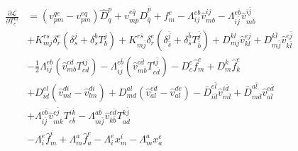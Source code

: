 \documentclass[a4paper,12pt,oneside]{book}
\newcommand{\half}{\frac{1}{2}}
\newcommand{\spa}[1]{{#1}}
\newcommand{\spb}[1]{\bar{#1}}
\begin{document}
\begin{equation}
\begin{aligned}
\frac{\partial\mathcal{L}}{\partial T^{\spa{m}}_{\spa{e}}}&=
\left(v_{\spa{p}\spa{m}}^{\spa{q}\spa{e}} - v_{\spa{p}\spa{m}}^{\spa{e}\spa{q}}\right) \hat D^{\spa{p}}_{\spa{q}}
+ v_{\spa{m}\spb{p}}^{\spa{e}\spb{q}} \hat D^{\spb{p}}_{\spb{q}}
+ f_{\spa{m}}^{\spa{e}}
- Λ_{\spa{i}\spa{j}}^{\spa{e}\spa{b}} \hat v_{\spa{m}\spa{b}}^{\spa{i}\spa{j}}
- Λ_{\spa{i}\spb{j}}^{\spa{e}\spb{b}} \hat v_{\spa{m}\spb{b}}^{\spa{i}\spb{j}}\\
&+ K_{\spa{m}\spa{j}}^{\spa{r}\spa{s}} \delta_{\spa{r}}^{\spa{e}} \left(\delta_{\spa{s}}^{\spa{j}} + \delta_{\spa{s}}^{\spa{b}} T^{\spa{j}}_{\spa{b}} \right) 
+ K_{\spa{m}\spb{j}}^{\spa{r}\spb{s}} \delta_{\spa{r}}^{\spa{e}} \left(\delta_{\spb{s}}^{\spb{j}} + \delta_{\spb{s}}^{\spb{b}} T^{\spb{j}}_{\spb{b}} \right) 
+ D_{\spa{m}\spa{j}}^{\spa{k}\spa{l}} \hat v_{\spa{k}\spa{l}}^{\spa{e}\spa{j}}
+ D_{\spa{m}\spb{j}}^{\spa{k}\spb{l}} \hat v_{\spa{k}\spb{l}}^{\spa{e}\spb{j}}\\
&- \half Λ_{\spa{i}\spa{j}}^{\spa{e}\spa{b}} \left(\hat v_{\spa{m}\spa{b}}^{\spa{c}\spa{d}} T^{\spa{i}\spa{j}}_{\spa{c}\spa{d}}\right)
- Λ_{\spa{i}\spb{j}}^{\spa{e}\spb{b}} \left(\hat v_{\spa{m}\spb{b}}^{\spa{c}\spb{d}} T^{\spa{i}\spb{j}}_{\spa{c}\spb{d}}\right)
- D_{\spa{c}}^{\spa{e}} \hat f_{\spa{m}}^{\spa{c}}
+ D_{\spa{m}}^{\spa{k}} \hat f_{\spa{k}}^{\spa{e}}\\
&+ D_{\spa{i}\spa{d}}^{\spa{e}\spa{l}} 
 \left(\hat v_{\spa{m}\spa{l}}^{\spa{d}\spa{i}}-\hat v_{\spa{l}\spa{m}}^{\spa{d}\spa{i}}\right)
+ D_{\spa{m}\spa{d}}^{\spa{a}\spa{l}} 
 \left(\hat v_{\spa{a}\spa{l}}^{\spa{e}\spa{d}}-\hat v_{\spa{a}\spa{l}}^{\spa{d}\spa{e}}\right) 
- \bar D_{\spa{i}\spb{d}}^{\spa{e}\spb{l}} \hat v_{\spa{m}\spb{l}}^{\spa{i}\spb{d}}  
+ \bar D_{\spa{m}\spb{d}}^{\spa{a}\spb{l}} \hat v_{\spa{a}\spb{l}}^{\spa{e}\spb{d}} \\
&+ Λ_{\spa{i}\spb{j}}^{\spa{e}\spb{b}} 
\hat v_{\spa{m}\spb{k}}^{\spa{c}\spb{j}} T^{\spa{i}\spb{k}}_{\spa{c}\spb{b}}
- Λ_{\spa{m}\spb{j}}^{\spa{a}\spb{b}} 
\hat v_{\spa{k}\spb{b}}^{\spa{e}\spb{d}} T^{\spa{k}\spb{j}}_{\spa{a}\spb{d}}\\
&-Λ_{\spa{i}}^{\spa{e}} \hat f_{\spa{m}}^{\spa{i}} 
+Λ_{\spa{m}}^{\spa{a}} \hat f_{\spa{a}}^{\spa{e}} 
- Λ_{\spa{i}}^{\spa{e}} x_{\spa{m}}^{\spa{i}}
- Λ_{\spa{m}}^{\spa{a}} x_{\spa{a}}^{\spa{e}}
\end{aligned}
\end{equation}
\end{document}
